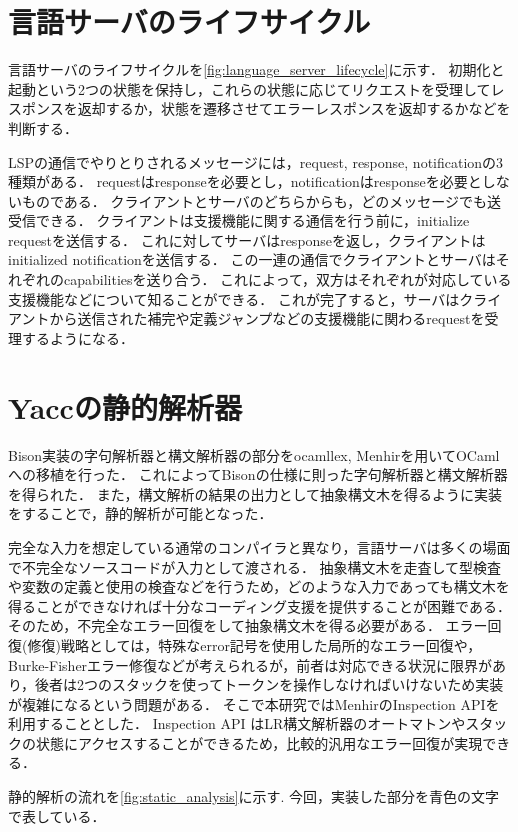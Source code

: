 \documentclass[fontsize=9bp,twocolumn,column_gap=2.36zw,a4paper,report]{jlreq}
\begin{document}
\begin{figure}[h]
\end{figure}

\section{言語サーバのライフサイクル}

言語サーバのライフサイクルを\ref{fig:language_server_lifecycle}に示す．
初期化と起動という2つの状態を保持し，これらの状態に応じてリクエストを受理してレスポンスを返却するか，状態を遷移させてエラーレスポンスを返却するかなどを判断する．\par
LSPの通信でやりとりされるメッセージには，request, response, notificationの3種類がある．
requestはresponseを必要とし，notificationはresponseを必要としないものである．
クライアントとサーバのどちらからも，どのメッセージでも送受信できる．
クライアントは支援機能に関する通信を行う前に，initialize requestを送信する．
これに対してサーバはresponseを返し，クライアントはinitialized notificationを送信する．
この一連の通信でクライアントとサーバはそれぞれのcapabilitiesを送り合う．
これによって，双方はそれぞれが対応している支援機能などについて知ることができる．
これが完了すると，サーバはクライアントから送信された補完や定義ジャンプなどの支援機能に関わるrequestを受理するようになる．

\section{Yaccの静的解析器}

Bison実装の字句解析器と構文解析器の部分をocamllex, Menhirを用いてOCamlへの移植を行った．
これによってBisonの仕様に則った字句解析器と構文解析器を得られた．
また，構文解析の結果の出力として抽象構文木を得るように実装をすることで，静的解析が可能となった．\par
完全な入力を想定している通常のコンパイラと異なり，言語サーバは多くの場面で不完全なソースコードが入力として渡される．
抽象構文木を走査して型検査や変数の定義と使用の検査などを行うため，どのような入力であっても構文木を得ることができなければ十分なコーディング支援を提供することが困難である．
そのため，不完全なエラー回復をして抽象構文木を得る必要がある．
エラー回復(修復)戦略としては，特殊なerror記号を使用した局所的なエラー回復や，Burke-Fisherエラー修復などが考えられるが，前者は対応できる状況に限界があり，後者は2つのスタックを使ってトークンを操作しなければいけないため実装が複雑になるという問題がある．
そこで本研究ではMenhirのInspection APIを利用することとした．
Inspection API はLR構文解析器のオートマトンやスタックの状態にアクセスすることができるため，比較的汎用なエラー回復が実現できる．\par
静的解析の流れを\ref{fig:static_analysis}に示す.
今回，実装した部分を青色の文字で表している．
\end{document}
